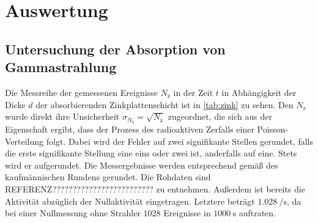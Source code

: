 \section{Auswertung}
\label{sec:Auswertung}

\subsection{Untersuchung der Absorption von Gammastrahlung}
\label{subsec:auswertunggamma}

Die Messreihe der gemessenen Ereignisse $N_\text{z}$ in der Zeit $t$ in Abhängigkeit der
Dicke $d$ der absorbierenden Zinkplattenschicht ist in \ref{tab:zink} zu sehen.
Den $N_\text{z}$ wurde direkt ihre Unsicherheit $\sigma_{N_\mathrm{z}} = \sqrt{N_\mathrm{z}}$
zugeordnet, die sich aus der Eigenschaft ergibt, dass der Prozess des radioaktiven Zerfalls
einer Poisson-Verteilung folgt. Dabei wird der Fehler auf zwei signifikante Stellen
gerundet, falls die erste signifikante Stellung eine eins oder zwei ist, anderfalls auf eine.
Stets wird er aufgerundet. Die Messergebnisse werden entsprechend gemäß des kaufmännischen
Rundens gerundet. Die Rohdaten sind REFERENZ????????????????????????? zu entnehmen.
Außerdem ist bereits die Aktivität abzüglich der Nullaktivität eingetragen.
Letztere beträgt $\SI{1.028}{\per\second}$, da bei einer Nullmessung ohne Strahler
1028 Ereignisse in $\SI{1000}{\second}$ auftraten.

